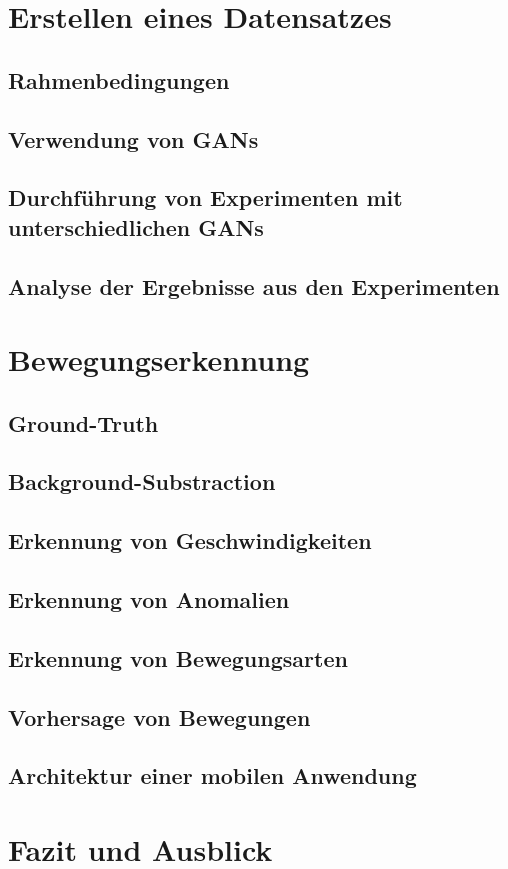\documentclass{hsflensburg}
\begin{document}
  \chapter{Erstellen eines Datensatzes}
  \section{Rahmenbedingungen}
  \section{Verwendung von GANs}
  \section{Durchführung von Experimenten mit unterschiedlichen GANs}
  \section{Analyse der Ergebnisse aus den Experimenten}

  \chapter{Bewegungserkennung}
  \section{Ground-Truth}
  \section{Background-Substraction}
  \section{Erkennung von Geschwindigkeiten}
  \section{Erkennung von Anomalien}
  \section{Erkennung von Bewegungsarten}
  \section{Vorhersage von Bewegungen}
  \section{Architektur einer mobilen Anwendung}

  \chapter{Fazit und Ausblick}

  \printbibliography
\end{document}
